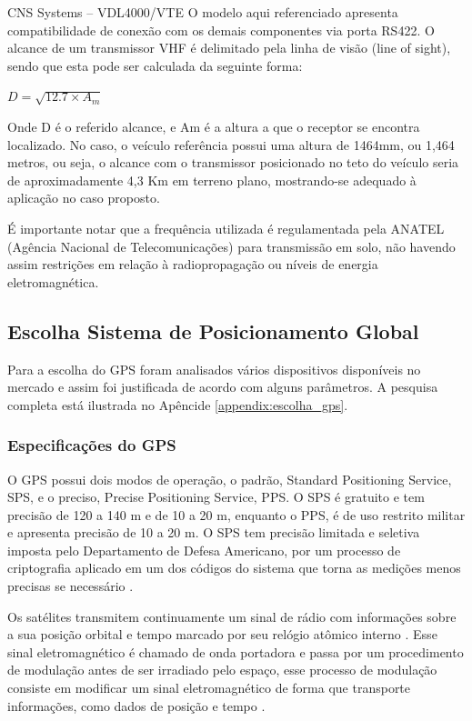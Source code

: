 CNS Systems – VDL4000/VTE \cite{datasheet_transponder}
O modelo aqui referenciado apresenta compatibilidade de conexão com os demais
componentes via porta RS422. O alcance de um transmissor VHF é delimitado pela
 linha de visão (line of sight), sendo que esta pode ser calculada da seguinte
 forma:

 $ D = \sqrt{12.7 \times A_{m}} $

 Onde D é o referido alcance, e Am é a altura a que o receptor se encontra
 localizado. No caso, o veículo referência possui uma altura de 1464mm, ou
 1,464 metros, ou seja, o alcance com o transmissor posicionado no teto do
 veículo seria de aproximadamente 4,3 Km em terreno plano, mostrando-se
 adequado à aplicação no caso proposto.

 É importante notar que a frequência utilizada é regulamentada pela ANATEL
 (Agência Nacional de Telecomunicações) para transmissão em solo, não havendo
  assim restrições em relação à radiopropagação ou níveis de energia
  eletromagnética.

\subsection{Escolha Sistema de Posicionamento Global}

Para a escolha do GPS foram analisados vários dispositivos disponíveis no mercado
e assim foi justificada de acordo com alguns parâmetros. A pesquisa completa está
ilustrada no Apêncide \ref{appendix:escolha_gps}.

\subsubsection{Especificações do GPS}

O GPS possui dois modos de operação, o padrão, Standard Positioning Service,
SPS, e o preciso, Precise Positioning Service, PPS. O SPS é gratuito e tem
precisão de 120 a 140 m e de 10 a 20 m, enquanto o PPS, é de uso restrito
militar e apresenta precisão de 10 a 20 m. O SPS tem precisão limitada e
seletiva imposta pelo Departamento de Defesa Americano, por um processo de
criptografia aplicado em um dos códigos do sistema que torna as medições
menos precisas se necessário \cite{6gps}.

Os satélites transmitem continuamente um sinal de rádio com informações sobre
a sua posição orbital e tempo marcado por seu relógio atômico interno \cite{7gps}.
 Esse sinal eletromagnético é chamado de onda portadora e passa por um
 procedimento de modulação antes de ser irradiado pelo espaço, esse processo
 de modulação consiste em modificar um sinal eletromagnético de forma que
 transporte informações, como dados de posição e tempo \cite{8gps}.

